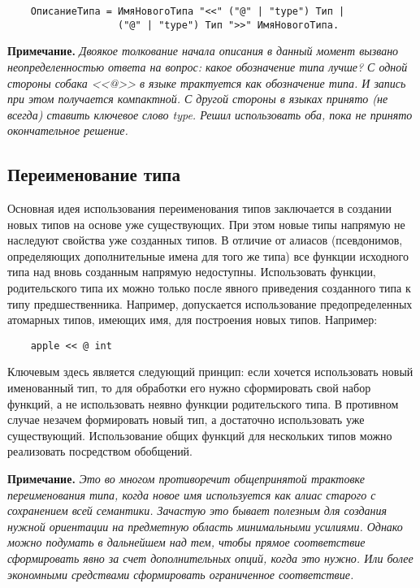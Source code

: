{\begin{verbatim}
    ОписаниеТипа = ИмяНовогоТипа "<<" ("@" | "type") Тип |
                   ("@" | "type") Тип ">>" ИмяНовогоТипа.
\end{verbatim}

\textbf{Примечание.}
\textit{Двоякое толкование начала описания в данный момент вызвано неопределенностью ответа на вопрос: какое обозначение типа лучше? С одной стороны собака <<@>> в языке трактуется как обозначение типа. И запись при этом получается компактной. С другой стороны в языках принято (не всегда) ставить ключевое слово type. Решил использовать оба, пока не принято окончательное решение.}

\subsection{Переименование типа}

Основная идея использования переименования типов заключается в создании новых типов на основе уже существующих. При этом новые типы напрямую не наследуют свойства уже созданных типов. В отличие от алиасов (псевдонимов, определяющих дополнительные имена для того же типа) все функции исходного типа над вновь созданным напрямую недоступны. Использовать функции, родительского типа их можно только после явного приведения созданного типа к типу предшественника. Например, допускается использование предопределенных атомарных типов, имеющих имя, для построения новых типов. Например:

\begin{verbatim}
    apple << @ int
\end{verbatim}


Ключевым здесь является следующий принцип: если хочется использовать новый именованный тип, то для обработки его нужно сформировать свой набор функций, а не использовать неявно функции родительского типа. В противном случае незачем формировать новый тип, а достаточно использовать уже существующий. Использование общих функций для нескольких типов можно реализовать посредством обобщений.

\textbf{Примечание.}
\textit{Это во многом противоречит общепринятой трактовке переименования типа, когда новое имя используется как алиас старого с сохранением всей семантики. Зачастую это бывает полезным для создания нужной ориентации на предметную область минимальными усилиями. Однако можно подумать в дальнейшем над тем, чтобы прямое соответствие сформировать явно за счет дополнительных опций, когда это нужно. Или более экономными средствами сформировать ограниченное соответствие.}

}
